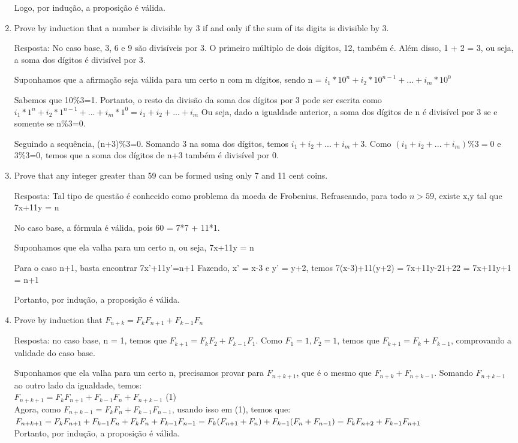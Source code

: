 \documentclass{article}
\begin{document}
\begin{enumerate}
	Logo, por indução, a proposição é válida.
	
    \item Prove by induction that a number is divisible by 3 if and only if the sum of its digits is divisible by 3.
    
    Resposta: No caso base, 3, 6 e 9 são divisíveis por 3. O primeiro múltiplo de dois dígitos, 12, também é. Além disso, 1 + 2 = 3, ou seja, a soma dos dígitos é divisível por 3.
    
    Suponhamos que a afirmação seja válida para um certo n com m dígitos, sendo n = $i_{1}*10^n+i_{2}*10^{n-1}+...+i_{m}*10^{0}$
    
    Sabemos que 10\%3=1. Portanto, o resto da divisão da soma dos dígitos por 3 pode ser escrita como $i_{1}*1^n+i_{2}*1^{n-1}+...+i_{m}*1^{0} = i_{1}+i_{2}+...+i_{m}$
	Ou seja, dado a igualdade anterior, a soma dos dígitos de n é divisível por 3 se e somente se n\%3=0.
	
	Seguindo a sequência, (n+3)\%3=0. Somando 3 na soma dos dígitos, temos $i_{1}+i_{2}+...+i_{m} + 3$. Como $(i_{1}+i_{2}+...+i_{m})\%3 = 0$ e 3\%3=0, temos que a soma dos dígitos de n+3 também é divisível por 0.
    
	\item Prove that any integer greater than 59 can be formed using only 7 and 11 cent coins.
  
	Resposta: Tal tipo de questão é conhecido como problema da moeda de Frobenius. Refraseando, para todo $n>59$, existe x,y tal que 7x+11y = n
  
	No caso base, a fórmula é válida, pois 60 = 7*7 + 11*1.
  
	Suponhamos que ela valha para um certo n, ou seja, 7x+11y = n
	
	Para o caso n+1, basta encontrar 7x'+11y'=n+1
	Fazendo, x' = x-3 e y' = y+2, temos 7(x-3)+11(y+2) = 7x+11y-21+22 = 7x+11y+1 = n+1
	
	Portanto, por indução, a proposição é válida.
	
  \item Prove by induction that $F_{n+k}=F_{k}F_{n+1}+F_{k-1}F_{n}$
  
  Resposta: no caso base, n = 1, temos que $F_{k+1}=F_{k}F_{2}+F_{k-1}F_{1}$. Como $F_{1} = 1, F_{2} = 1$, temos que $F_{k+1}=F_{k}+F_{k-1}$, comprovando a validade do caso base.
  
  Suponhamos que ela valha para um certo n, precisamos provar para $F_{n+k+1}$, que é o mesmo que $F_{n+k} + F_{n+k-1}$. Somando $F_{n+k-1}$ ao outro lado da igualdade, temos:\\ 
  $F_{n+k+1}=F_{k}F_{n+1}+F_{k-1}F_{n}+F_{n+k-1}$ (1)\\
  Agora, como $F_{n+k-1} = F_{k}F_{n}+F_{k-1}F_{n-1}$, usando isso em (1), temos que: \\ $F_{n+k+1}=F_{k}F_{n+1}+F_{k-1}F_{n}+F_{k}F_{n}+F_{k-1}F_{n-1} = \\
  F_{k}(F_{n+1}+F_{n})+F_{k-1}(F_{n}+F_{n-1}) = \\
  F_{k}F_{n+2}+F_{k-1}F_{n+1}$ \\
  Portanto, por indução, a proposição é válida.
  

\end{enumerate}
\end{document}
